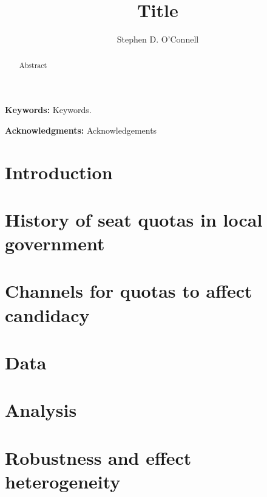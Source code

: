 \documentclass[12pt,letterpaper,oneside]{article}
\begin{document}
\title{Title}
\author{Stephen D. O'Connell}

  
\maketitle 
\begin{abstract}
\singlespace \noindent Abstract
\end{abstract}

\textbf{Keywords:} 
Keywords.

\singlespace 
\textbf{Acknowledgments:} Acknowledgements

\newpage
\doublespace
\section{Introduction}


\section{History of seat quotas in local government}

\section{Channels for quotas to affect candidacy}

\section{Data}


\section{Analysis}

\section{Robustness and effect heterogeneity}
\end{document}
